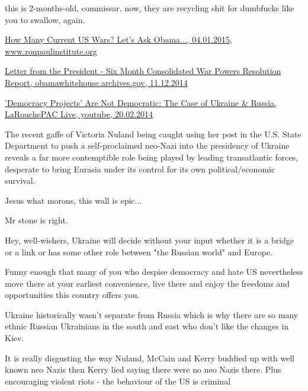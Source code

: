 \begin{itemize}
\begin{itemize}

this is 2-months-old, commissar. now, they are recycling shit for dumbfucks
like you to swallow, again.


\href{http://www.ronpaulinstitute.org/archives/peace-and-prosperity/2015/january/04/how-many-current-us-wars-lets-ask-obama}{%
How Many Current US Wars? Let's Ask Obama..., 04.01.2015, www.ronpaulinstitute.org%
}

\href{https://obamawhitehouse.archives.gov/the-press-office/2014/12/11/letter-president-six-month-consolidated-war-powers-resolution-report}{%
Letter from the President - Six Month Consolidated War Powers Resolution Report, obamawhitehouse.archives.gov, 11.12.2014%
}


\href{https://www.youtube.com/watch?v=_kmYRfNfRkM}{%
'Democracy Projects' Are Not Democratic: The Case of Ukraine \& Russia, LaRouchePAC Live, youtube, 20.02.2014%
}

The recent gaffe of Victoria Nuland being caught using her post in the U.S.
State Department to push a self-proclaimed neo-Nazi into the presidency of
Ukraine reveals a far more contemptible role being played by leading
transatlantic forces, desperate to bring Eurasia under its control for its own
political/economic survival.

Jesus what morons, this wall is epic...

Mr stone is right.


Hey, well-wishers, Ukraine will decide without your input whether it is a
bridge or a link or has some other role between "the Russian world" and Europe.

Funny enough that many of you who despise democracy and hate US nevertheless
move there at your earliest convenience, live there and enjoy the freedoms and
opportunities this country offers you.


Ukraine historically wasn't separate from Russia which is why there are so many
ethnic Russian Ukrainians in the south and east who don't like the changes in
Kiev.

It is really disgusting the way Nuland, McCain and Kerry buddied up with well
known neo Nazis then Kerry lied saying there were no neo Nazis there. Plus
encouraging violent riots - the behaviour of the US is criminal


\end{itemize}
\end{itemize}
